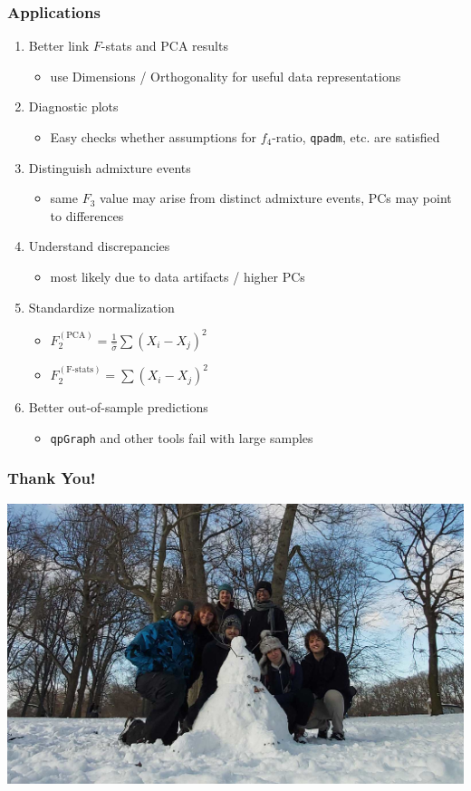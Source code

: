 \documentclass[11pt]{beamer}
\begin{document}
\begin{frame}
\frametitle{Applications}
\begin{enumerate}
	\item <1->Better link $F$-stats and PCA results
		\begin{itemize}
			\item<1-> use Dimensions / Orthogonality for useful data representations
		\end{itemize}
	    \item<2-> Diagnostic plots
	\begin{itemize}
		\item<2-> Easy checks whether assumptions for $f_4$-ratio, \texttt{qpadm}, etc. are satisfied
	\end{itemize}
		
 	\item<3-> Distinguish admixture events
\begin{itemize}
	\item<4-> same $F_3$ value may arise from distinct admixture events, PCs may point to differences
\end{itemize}
\item<5-> Understand discrepancies
\begin{itemize}
	\item<6-> most likely due to data artifacts / higher PCs
\end{itemize}	
	\item <7->Standardize normalization 
	\begin{itemize}
		\item <7->$F_2^{(\text{PCA})} = \frac{1}{\hat\sigma}\sum(X_i - X_j)^2$
		\item <7->$F_2^{(\text{F-stats})} = \sum(X_i - X_j)^2$		
	\end{itemize}
    \item<8-> Better out-of-sample predictions
\begin{itemize}
	\item<8-> \texttt{qpGraph} and other tools fail with large samples
\end{itemize}
    
\end{enumerate}
\end{frame}

\begin{frame}
	\frametitle{Thank You!}
	\includegraphics[width=\textwidth]{figures/group_photo.png}
\end{frame}
\end{document}
